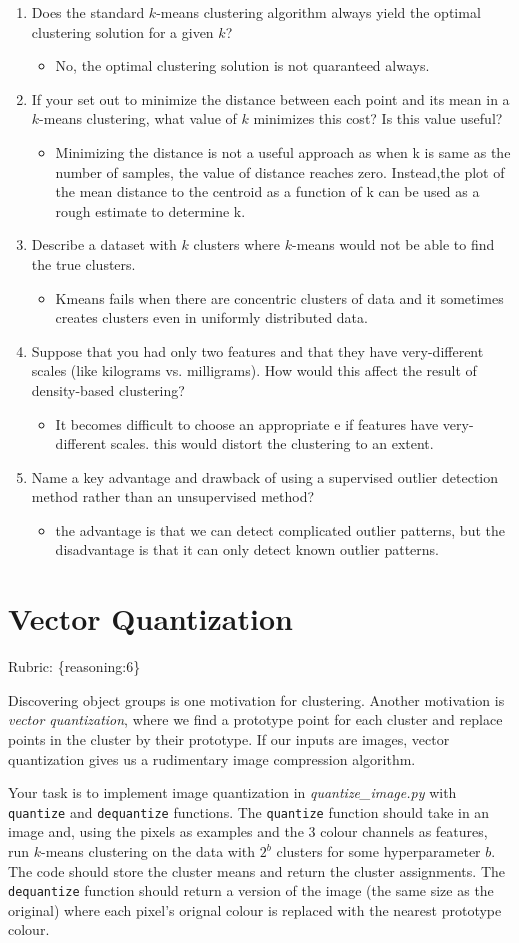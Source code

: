 \documentclass{article}
\def\gre#1{{\color{gre}#1}}
\def\items#1{\begin{itemize}#1\end{itemize}}
\def\enum#1{\begin{enumerate}#1\end{enumerate}}
\def\rubric#1{\gre{Rubric: \{#1\}}}{}
\begin{document}
{{{{{
\enum{
\item Does the standard $k$-means clustering algorithm always yield the optimal clustering solution for a given $k$?
\items{
\item No, the optimal clustering solution is not quaranteed always.
}
\item If your set out to minimize the distance between each point and its mean in a $k$-means clustering, what value of $k$ minimizes this cost? Is this value useful?
\items{
\item Minimizing the distance is not a useful approach as when k is same as the number of samples, the value of distance reaches zero. Instead,the plot of the mean distance to the centroid as a function of k can be used as a rough estimate to determine  k.
}
\item Describe a dataset with $k$ clusters where $k$-means would not be able to find the true clusters.
\items{
\item Kmeans fails when there are concentric clusters of data and it sometimes creates clusters even in uniformly distributed data.
}
\item Suppose that you had only two features and that they have very-different scales (like kilograms vs. milligrams). How would this affect the result of density-based clustering?
\items{
\item It becomes difficult to choose an appropriate e if features have very-different scales. this would distort the clustering to an extent.
}
\item Name a key advantage and drawback of using a supervised outlier detection method rather than an unsupervised method?
\items{
\item the advantage is that we can detect complicated outlier patterns, but the disadvantage is that it can only detect known outlier patterns.
}
}



\section{Vector Quantization}
\rubric{reasoning:6}

Discovering object groups is one motivation for clustering. Another motivation is \emph{vector quantization}, where we find a prototype point for each cluster and replace points in the cluster by their prototype. If our inputs are images, vector quantization gives us a rudimentary image compression algorithm.

Your task is to implement image quantization in \emph{quantize\_image.py} with \texttt{quantize} and \texttt{dequantize} functions. The \texttt{quantize} function should take in an image and, using the pixels as examples and the 3 colour channels as features, run $k$-means clustering on the data with $2^b$ clusters for some hyperparameter $b$. The code should store the cluster means and return the cluster assignments. The \texttt{dequantize} function should return a version of the image (the same size as the original) where each pixel's orignal colour is replaced with the nearest prototype colour.

}}}}}
\end{document}
